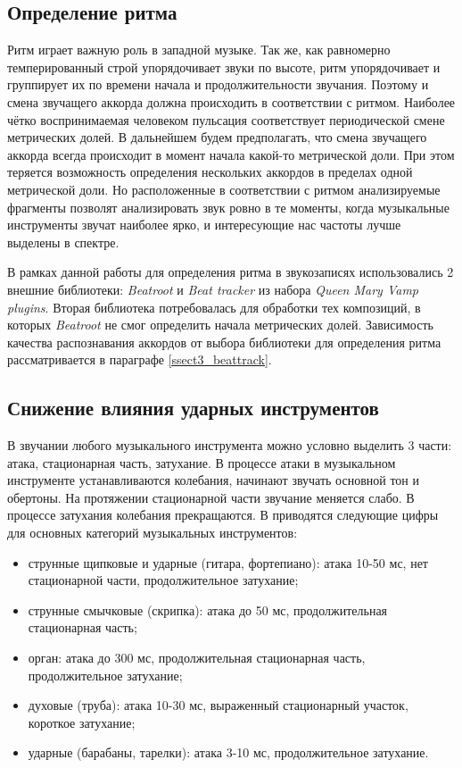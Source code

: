 \subsection{Определение ритма} \label{ssect1_rhyhtm}

Ритм играет важную роль в западной музыке. Так же, как равномерно
темперированный строй упорядочивает звуки по высоте, ритм упорядочивает и
группирует их по времени начала и продолжительности звучания. Поэтому и смена
звучащего аккорда должна происходить в соответствии с ритмом. Наиболее чётко
воспринимаемая человеком пульсация соответствует периодической смене метрических
долей. В дальнейшем будем предполагать, что смена звучащего аккорда всегда
происходит в момент начала какой-то метрической доли. При этом теряется
возможность определения нескольких аккордов в пределах одной метрической доли.
Но расположенные в соответствии с ритмом анализируемые фрагменты позволят
анализировать звук ровно в те моменты, когда музыкальные инструменты звучат
наиболее ярко, и интересующие нас частоты лучше выделены в спектре.

В рамках данной работы для определения ритма в звукозаписях использовались 2
внешние библиотеки: \emph{Beatroot} \cite{Dixon2007} и \emph{Beat tracker}
\cite{Davies2007} из набора \emph{Queen Mary Vamp plugins}. Вторая библиотека
потребовалась для обработки тех композиций, в которых \emph{Beatroot} не
смог определить начала метрических долей. Зависимость качества распознавания
аккордов от выбора библиотеки для определения ритма рассматривается в параграфе
\ref{ssect3_beattrack}.

\subsection{Снижение влияния ударных инструментов}

В звучании любого музыкального инструмента можно условно выделить 3 части:
атака, стационарная часть, затухание. В процессе атаки в музыкальном
инструменте устанавливаются колебания, начинают звучать основной тон и
обертоны. На протяжении стационарной части звучание меняется слабо. В процессе
затухания колебания прекращаются. В \cite{Aldoshina2006} приводятся следующие
цифры для основных категорий музыкальных инструментов:
\begin{itemize}
  \item струнные щипковые и ударные (гитара, фортепиано): атака 10-50 мс, нет
  стационарной части, продолжительное затухание;
  \item струнные смычковые (скрипка): атака до 50 мс, продолжительная
  стационарная часть;
  \item орган: атака до 300 мс, продолжительная стационарная часть,
  продолжительное затухание;
  \item духовые (труба): атака 10-30 мс, выраженный стационарный участок,
  короткое затухание;
  \item ударные (барабаны, тарелки): атака 3-10 мс, продолжительное затухание.
\end{itemize}

